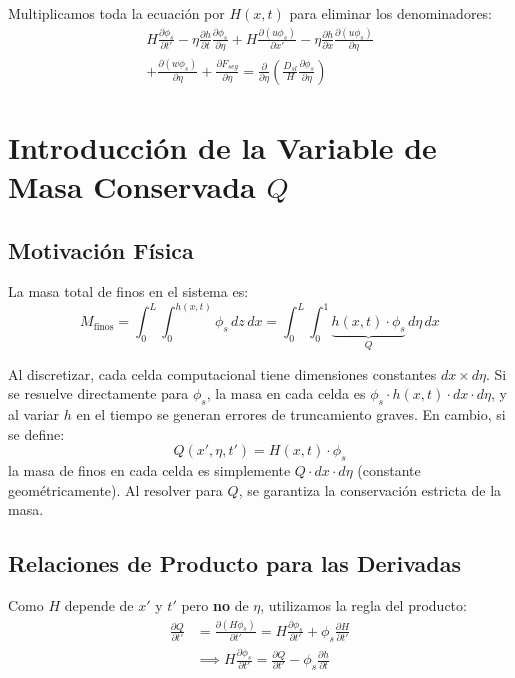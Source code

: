 \documentclass[11pt,a4paper]{article}
\begin{document}
Multiplicamos toda la ecuación por $H(x,t)$ para eliminar los denominadores:
\begin{multline}
    H\frac{\partial \phi_s}{\partial t'} - \eta\frac{\partial h}{\partial t}\frac{\partial \phi_s}{\partial \eta} + H\frac{\partial(u\phi_s)}{\partial x'} - \eta\frac{\partial h}{\partial x}\frac{\partial(u\phi_s)}{\partial \eta} \\
    + \frac{\partial(w\phi_s)}{\partial \eta} + \frac{\partial F_{seg}}{\partial \eta} = \frac{\partial}{\partial \eta}\left(\frac{D_{sl}}{H}\frac{\partial \phi_s}{\partial \eta}\right)
\end{multline}


\section{Introducción de la Variable de Masa Conservada $Q$}

\subsection{Motivación Física}
La masa total de finos en el sistema es:
\begin{equation}
    M_{\text{finos}} = \int_0^L \int_0^{h(x,t)} \phi_s \, dz \, dx = \int_0^L \int_0^1 \underbrace{h(x,t) \cdot \phi_s}_{Q} \, d\eta \, dx
\end{equation}

Al discretizar, cada celda computacional tiene dimensiones constantes $dx \times d\eta$. Si se resuelve directamente para $\phi_s$, la masa en cada celda es $\phi_s \cdot h(x,t) \cdot dx \cdot d\eta$, y al variar $h$ en el tiempo se generan errores de truncamiento graves. En cambio, si se define:
\begin{equation}
    Q(x', \eta, t') = H(x,t) \cdot \phi_s
\end{equation}
la masa de finos en cada celda es simplemente $Q \cdot dx \cdot d\eta$ (constante geométricamente). Al resolver para $Q$, se garantiza la conservación estricta de la masa.

\subsection{Relaciones de Producto para las Derivadas}
Como $H$ depende de $x'$ y $t'$ pero \textbf{no} de $\eta$, utilizamos la regla del producto:
\begin{align}
    \frac{\partial Q}{\partial t'} &= \frac{\partial(H\phi_s)}{\partial t'} = H\frac{\partial \phi_s}{\partial t'} + \phi_s\frac{\partial H}{\partial t'} \nonumber \\
    &\implies H\frac{\partial \phi_s}{\partial t'} = \frac{\partial Q}{\partial t'} - \phi_s\frac{\partial h}{\partial t}
\end{align}
\end{document}

